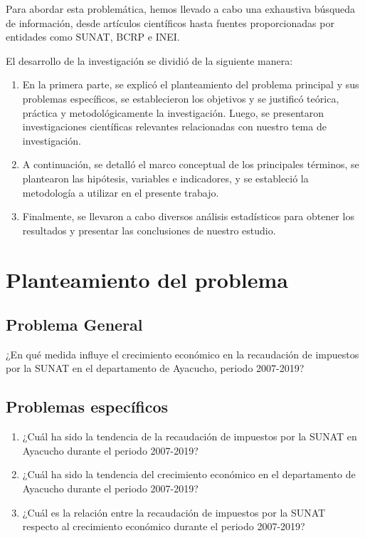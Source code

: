 \documentclass[
  jou,
  floatsintext,
  longtable,
  a4paper,
  nolmodern,
  notxfonts,
  notimes,
  12pt,
  colorlinks=true,linkcolor=blue,citecolor=blue,urlcolor=blue]{apa7}
\begin{document}
Para abordar esta problemática, hemos llevado a cabo una exhaustiva
búsqueda de información, desde artículos científicos hasta fuentes
proporcionadas por entidades como SUNAT, BCRP e INEI.

El desarrollo de la investigación se dividió de la siguiente manera:

\begin{enumerate}
\def\labelenumi{\arabic{enumi}.}
\item
  En la primera parte, se explicó el planteamiento del problema
  principal y sus problemas específicos, se establecieron los objetivos
  y se justificó teórica, práctica y metodológicamente la investigación.
  Luego, se presentaron investigaciones científicas relevantes
  relacionadas con nuestro tema de investigación.
\item
  A continuación, se detalló el marco conceptual de los principales
  términos, se plantearon las hipótesis, variables e indicadores, y se
  estableció la metodología a utilizar en el presente trabajo.
\item
  Finalmente, se llevaron a cabo diversos análisis estadísticos para
  obtener los resultados y presentar las conclusiones de nuestro
  estudio.
\end{enumerate}

\section{Planteamiento del
problema}\label{sec-planteamiento-del-problema}

\subsection{Problema General}\label{sec-problema-general}

¿En qué medida influye el crecimiento económico en la recaudación de
impuestos por la SUNAT en el departamento de Ayacucho, periodo
2007-2019?

\subsection{Problemas específicos}\label{sec-problemas-especuxedficos}

\begin{enumerate}
\def\labelenumi{\arabic{enumi}.}
\item
  ¿Cuál ha sido la tendencia de la recaudación de impuestos por la SUNAT
  en Ayacucho durante el periodo 2007-2019?
\item
  ¿Cuál ha sido la tendencia del crecimiento económico en el
  departamento de Ayacucho durante el periodo 2007-2019?
\item
  ¿Cuál es la relación entre la recaudación de impuestos por la SUNAT
  respecto al crecimiento económico durante el periodo 2007-2019?
\end{enumerate}
\end{document}
